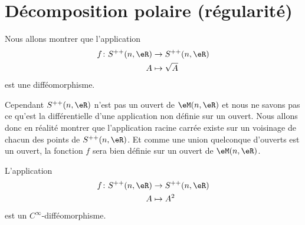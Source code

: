 \section{Décomposition polaire (régularité)}

\begin{normaltext}      \label{NomDJMUooTRUVkS}
    Nous allons montrer que l'application
    \begin{equation}
        \begin{aligned}
            f\colon S^{++}(n,\eR)&\to S^{++}(n,\eR) \\
            A&\mapsto \sqrt{A} 
        \end{aligned}
    \end{equation}
    est une difféomorphisme.

    Cependant \( S^{++}(n,\eR)\) n'est pas un ouvert de \( \eM(n,\eR)\) et nous ne savons pas ce qu'est la différentielle d'une application non définie sur un ouvert. Nous allons donc en réalité montrer que l'application racine carrée existe sur un voisinage de chacun des points de \( S^{++}(n,\eR)\). Et comme une union quelconque d'ouverts est un ouvert, la fonction \( f\) sera bien définie sur un ouvert de \( \eM(n,\eR)\).
\end{normaltext}

\begin{lemma}       \label{LemLBFOooDdNcgy}
    L'application 
    \begin{equation}
        \begin{aligned}
            f\colon S^{++}(n,\eR)&\to S^{++}(n,\eR) \\
            A&\mapsto A^2 
        \end{aligned}
    \end{equation}
    est un \(  C^{\infty}\)-difféomorphisme.
\end{lemma}

